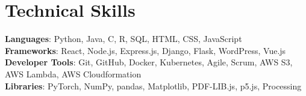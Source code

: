 \documentclass[letterpaper,11pt]{article}
\begin{document}
\section{Technical Skills}
 \begin{itemize}[leftmargin=0.15in, label={}]
    \small{\item{
     \textbf{Languages}{: Python, Java, C, R, SQL, HTML, CSS, JavaScript} \\
     \textbf{Frameworks}{: React, Node.js, Express.js, Django, Flask, WordPress, Vue.js} \\
     \textbf{Developer Tools}{: Git, GitHub, Docker, Kubernetes, Agile, Scrum, AWS S3, AWS Lambda, AWS Cloudformation} \\
     \textbf{Libraries}{: PyTorch, NumPy, pandas, Matplotlib, PDF-LIB.js, p5.js, Processing}
    }}
 \end{itemize}

\end{document}

